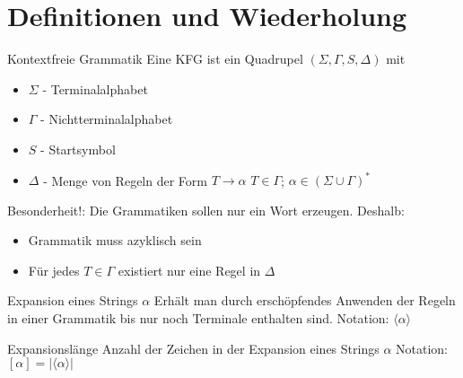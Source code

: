 \section{Definitionen und Wiederholung}
\begin{frame}{\FrameName}
	\begin{block}{Kontextfreie Grammatik}
		\Gap
		Eine KFG ist ein Quadrupel $(\Sigma,\Gamma,S,\Delta)$ mit
		\begin{itemize}
			\item $\Sigma$ - Terminalalphabet
			\item $\Gamma$ - Nichtterminalalphabet
			\item $S$ - Startsymbol
			\item $\Delta$ - Menge von Regeln der Form $T\rightarrow\alpha$\linebreak
			$T \in \Gamma$;
			$\alpha \in (\Sigma \cup \Gamma)^\ast$
		\end{itemize}
	\end{block}
	
\end{frame}

\begin{frame}{\FrameName}
\begin{alert}{Besonderheit!:}
	\Gap
	Die Grammatiken sollen nur ein Wort erzeugen. Deshalb:
	\begin{itemize}
		
		\item Grammatik muss azyklisch sein
		\item Für jedes $T \in \Gamma$ existiert nur eine Regel in $\Delta$
	\end{itemize}
\end{alert}
\end{frame}

\begin{frame}{\FrameName}
\begin{block}{Expansion  eines Strings $\alpha$}
	\Gap
	Erhält man durch erschöpfendes Anwenden der Regeln in einer Grammatik bis nur noch Terminale enthalten sind. \linebreak
	Notation: $\langle \alpha \rangle$
\end{block}
\end{frame}

\begin{frame}{\FrameName}
\begin{block}{Expansionslänge}
	\Gap
	Anzahl der Zeichen in der Expansion eines Strings $\alpha$ \linebreak
	Notation: $[\alpha]  = \lvert \langle \alpha \rangle \lvert$
\end{block}
\end{frame}

